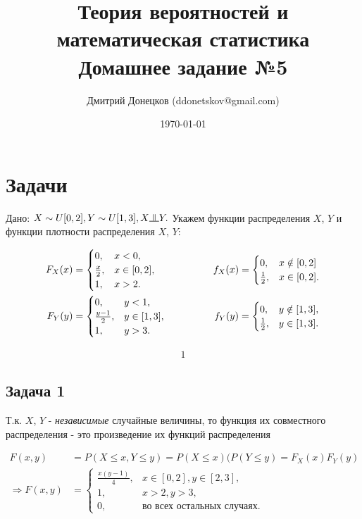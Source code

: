 \documentclass[a4paper,11pt]{article}
\title{\vspace{-1.5cm}Теория вероятностей и математическая статистика \\
Домашнее задание №5}
\author{Дмитрий Донецков (ddonetskov@gmail.com)}
\date{\today}
\newcommand{\independent}{\raisebox{0.05em}{\rotatebox[origin=c]{90}{$\models$}}}
\begin{document}
\maketitle

\section{Задачи}

Дано: $X \sim U[0,2], Y \sim U[1,3], X \independent Y.$ Укажем функции распределения $X$, $Y$ и функции плотности распределения $X$, $Y$:

\begin{align*}
F_X(x) & = 
\begin{cases}
  0,   & x < 0, \\
  \frac{x}{2}, & x \in [0,2], \\
  1,   & x > 2.
\end{cases}
\hspace{2cm}
f_X(x) = 
\begin{cases}
0, & x \notin [0,2] \\
\frac{1}{2}, & x \in [0,2].
\end{cases}
\\
F_Y(y) & = 
\begin{cases}
0,   & y < 1, \\
\frac{y-1}{2}, & y \in [1,3], \\
1,   & y > 3.
\end{cases}
\hspace{1.7cm}
f_Y(y) = 
\begin{cases}
0,   & y \notin [1,3], \\
\frac{1}{2}, & y \in [1,3].
\end{cases}
\end{align*}

\begin{align*}
1
\end{align*}

\subsection{Задача 1}

Т.к. $X$, $Y$ - \textit{независимые} случайные величины, то функция их совместного распределения - это произведение их функций распределения 

\begin{align*}
F(x, y) & = P(X \leq x, Y \leq y) = P(X \leq x) (P(Y \leq y) = F_X(x) F_Y(y) \\
\Rightarrow
F(x, y) & =
\begin{cases}
\frac{x(y-1)}{4}, & x \in [0,2], y \in [2,3], \\
1,   & x > 2, y > 3, \\
0,   & \text{во всех остальных случаях}.
\end{cases}
\end{align*}
\end{document}
